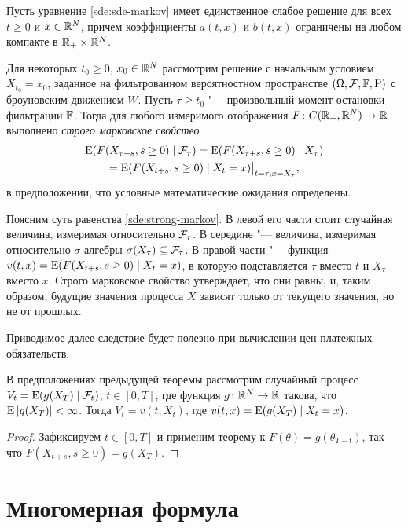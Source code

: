 \begin{theorem}
\label{sde:t:strong-markov}
Пусть уравнение \eqref{sde:sde-markov} имеет единственное слабое решение для всех $t\ge0$ и $x\in \mathbb{R}^N$, причем коэффициенты $a(t,x)$ и $b(t,x)$ ограничены на любом компакте в $\mathbb{R}_+\times\mathbb{R}^N$.

Для некоторых $t_0\ge0$, $x_0\in\mathbb{R}^N$ рассмотрим решение с начальным условием $X_{t_0}=x_0$, заданное на фильтрованном вероятностном пространстве $(\Omega,\mathcal{F},\mathbb{F},\mathrm{P})$ с броуновским движением $W$.
Пусть $\tau\ge t_0$ "--- произвольный момент остановки фильтрации $\mathbb{F}$.
Тогда для любого измеримого отображения $F\colon C(\mathbb{R}_+,\mathbb{R}^N) \to \mathbb{R}$ выполнено \emph{строго марковское свойство}%
\begin{multline}
\label{sde:strong-markov}
\operatorname{E} (F(X_{\tau + s}, s\ge 0) \mid \mathcal{F}_\tau) = \operatorname{E} (F(X_{\tau + s}, s\ge 0) \mid X_\tau) \\
= \operatorname{E}(F(X_{t+s}, s\ge 0) \mid X_t=x) \big|_{t=\tau,x=X_\tau},
\end{multline}
в предположении, что условные математические ожидания определены.
\end{theorem}

Поясним суть равенства \eqref{sde:strong-markov}.
В левой его части стоит случайная величина, измеримая относительно $\mathcal{F}_\tau$.
В середине "--- величина, измеримая относительно $\sigma$-алгебры $\sigma(X_\tau)\subseteq \mathcal{F}_\tau$.
В правой части "--- функция $v(t,x) = \operatorname{E}(F(X_{t+s}, s\ge 0) \mid X_t=x)$, в которую подставляется $\tau$ вместо $t$ и $X_\tau$ вместо $x$.
Строго марковское свойство утверждает, что они равны, и, таким образом, будущие значения процесса $X$ зависят только от текущего значения, но не от прошлых.

\medskip
Приводимое далее следствие будет полезно при вычислении цен платежных обязательств.

\begin{corollary}
В предположениях предыдущей теоремы рассмотрим случайный процесс $V_t = \operatorname{E}(g(X_T) \mid \mathcal{F}_t)$, $t\in[0,T]$, где функция $g\colon\mathbb{R}^N\to\mathbb{R}$ такова, что $\operatorname{E} |g(X_T)| < \infty$.
Тогда $V_t = v(t,X_t)$, где $v(t,x) = \operatorname{E}(g(X_T) \mid X_t=x)$.
\end{corollary}
\begin{proof}
Зафиксируем $t\in[0,T]$ и применим теорему к $F(\theta) = g(\theta_{T-t})$, так что $F(X_{t+s}, s\ge 0) = g(X_T)$.
\end{proof}


\section{Многомерная формула \fc}

